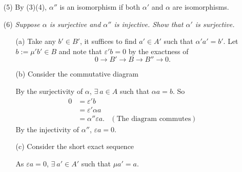 \documentclass{article}
\begin{document}
\begin{enumerate}
\item[(5)]
  By (3)(4), $\alpha''$ is an isomorphism
  if both $\alpha'$ and $\alpha$ are isomorphisms.

\item[(6)]
  \emph{Suppose $\alpha$ is surjective and $\alpha''$ is injective.
  Show that $\alpha'$ is surjective.}
  \begin{enumerate}
  \item[(a)]
    Take any $b' \in B'$, it suffices to find $a' \in A'$ such that $\alpha' a' = b'$.
    Let $b := \mu' b' \in B$ and note that $\varepsilon' b = 0$ by the exactness of
    \[
      0 \to B' \to B \to B'' \to 0.
    \]

  \item[(b)]
    Consider the commutative diagram
    \begin{center}
    \end{center}
    By the surjectivity of $\alpha$,
    $\exists \: a \in A$ such that $\alpha a = b$.
    So
    \begin{align*}
      0
      &= \varepsilon' b \\
      &= \varepsilon' \alpha a \\
      &= \alpha'' \varepsilon a.
        &(\text{The diagram commutes})
    \end{align*}
    By the injectivity of $\alpha''$, $\varepsilon a = 0$.

  \item[(c)]
    Consider the short exact sequence
    \begin{center}
    \end{center}
    As $\varepsilon a = 0$, $\exists \: a' \in A'$ such that $\mu a' = a$.


\end{enumerate}
\end{enumerate}
\end{document}
